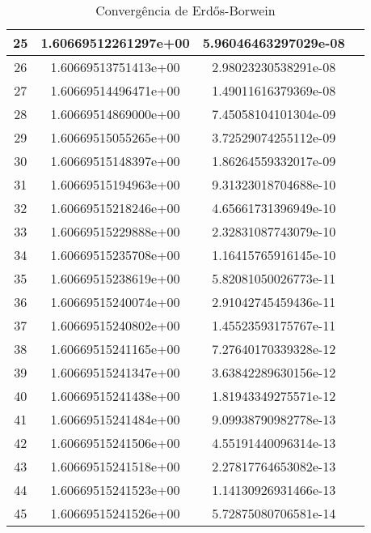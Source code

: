 \begin{table}[H]
\begin{tabular}{|c|c|c|c|}
\hline
25 & 1.60669512261297e+00 &  5.96046463297029e-08 \\ 
\hline
26 & 1.60669513751413e+00 &  2.98023230538291e-08 \\ 
\hline
27 & 1.60669514496471e+00 &  1.49011616379369e-08 \\ 
\hline
28 & 1.60669514869000e+00 &  7.45058104101304e-09 \\ 
\hline
29 & 1.60669515055265e+00 &  3.72529074255112e-09 \\ 
\hline
30 & 1.60669515148397e+00 &  1.86264559332017e-09 \\ 
\hline
31 & 1.60669515194963e+00 &  9.31323018704688e-10 \\ 
\hline
32 & 1.60669515218246e+00 &  4.65661731396949e-10 \\ 
\hline
33 & 1.60669515229888e+00 &  2.32831087743079e-10 \\ 
\hline
34 & 1.60669515235708e+00 &  1.16415765916145e-10 \\ 
\hline
35 & 1.60669515238619e+00 &  5.82081050026773e-11 \\ 
\hline
36 & 1.60669515240074e+00 &  2.91042745459436e-11 \\ 
\hline
37 & 1.60669515240802e+00 &  1.45523593175767e-11 \\ 
\hline
38 & 1.60669515241165e+00 &  7.27640170339328e-12 \\ 
\hline
39 & 1.60669515241347e+00 &  3.63842289630156e-12 \\ 
\hline
40 & 1.60669515241438e+00 &  1.81943349275571e-12 \\ 
\hline
41 & 1.60669515241484e+00 &  9.09938790982778e-13 \\ 
\hline
42 & 1.60669515241506e+00 &  4.55191440096314e-13 \\ 
\hline
43 & 1.60669515241518e+00 &  2.27817764653082e-13 \\ 
\hline
44 & 1.60669515241523e+00 &  1.14130926931466e-13 \\ 
\hline
45 & 1.60669515241526e+00 &  5.72875080706581e-14 \\ 
\hline
\end{tabular}
\caption{Convergência de Erdős-Borwein}
\label{table:erdos}
\end{table}